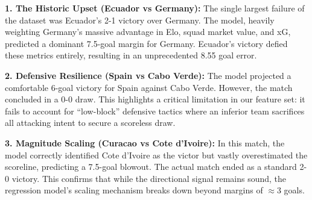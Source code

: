 \documentclass[a4paper,twoside]{article}
\begin{document}
\begin{table}[H]
\centering
\caption{Top 5 Matches with Maximum Absolute Error between Predicted and Actual Goal Margins.}
\label{tab:outliers}
\small
{}
\end{table}

\noindent
\textbf{1. The Historic Upset (Ecuador vs Germany):}
The single largest failure of the dataset was Ecuador's 2-1 victory over Germany. The model, heavily weighting Germany's massive advantage in Elo, squad market value, and xG, predicted a dominant 7.5-goal margin for Germany. Ecuador's victory defied these metrics entirely, resulting in an unprecedented 8.55 goal error.

\textbf{2. Defensive Resilience (Spain vs Cabo Verde):}
The model projected a comfortable 6-goal victory for Spain against Cabo Verde. However, the match concluded in a 0-0 draw. This highlights a critical limitation in our feature set: it fails to account for ``low-block'' defensive tactics where an inferior team sacrifices all attacking intent to secure a scoreless draw.

\textbf{3. Magnitude Scaling (Curacao vs Cote d'Ivoire):}
In this match, the model correctly identified Cote d'Ivoire as the victor but vastly overestimated the scoreline, predicting a 7.5-goal blowout. The actual match ended as a standard 2-0 victory. This confirms that while the directional signal remains sound, the regression model's scaling mechanism breaks down beyond margins of $\approx$3 goals.

\end{document}
